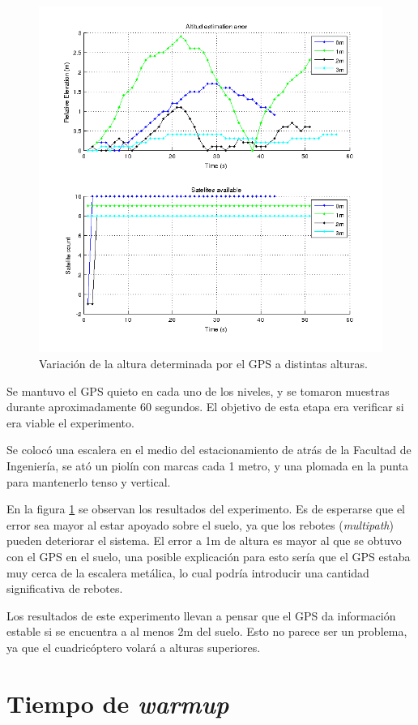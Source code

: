\documentclass[main]{subfiles}
\begin{document}
\begin{figure}
\vspace{-30pt}
  \begin{center}
  \includegraphics[width=.5\textwidth]{./pics_gps/altura_punto_fijo_fing.png}
  \end{center}
\vspace{-25pt}
  \caption{Variación de la altura determinada por el GPS a distintas alturas.}
  \label{fig:altura_punto_fijo_fing.png}
\vspace{-15pt}
\end{figure}

Se mantuvo el GPS quieto en cada uno de los niveles, y se tomaron muestras durante aproximadamente 60 segundos. El objetivo de esta etapa era verificar si era viable el experimento.

Se colocó una escalera en el medio del estacionamiento de atrás de la Facultad de Ingeniería, se ató un piolín con marcas cada 1 metro, y una plomada en la punta para mantenerlo tenso y vertical.

En la figura \ref{fig:altura_punto_fijo_fing.png} se observan los resultados del experimento. Es de esperarse que el error sea mayor al estar apoyado sobre el suelo, ya que los rebotes (\textit{multipath}) pueden deteriorar el sistema. El error a 1m de altura es mayor al que se obtuvo con el GPS en el suelo, una posible explicación para esto sería que el GPS estaba muy cerca de la escalera metálica, lo cual podría introducir una cantidad significativa de rebotes.

Los resultados de este experimento llevan a pensar que el GPS da información estable si se encuentra a al menos 2m del suelo. Esto no parece ser un problema, ya que el cuadricóptero volará a alturas superiores.

\section{Tiempo de \textit{warmup}}
\label{sec:tiempo-de-warmup}
\end{document}
